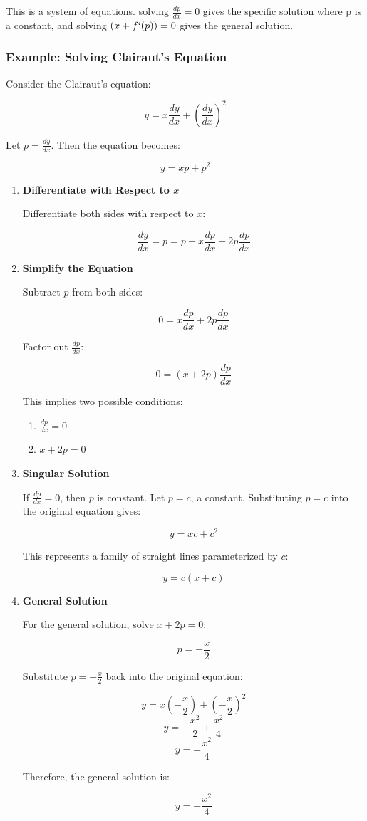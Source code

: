 \documentclass[12pt]{article}
\begin{document}
This is a system of equations. solving \(\frac{dp}{dx}=0\) gives the specific solution where p is a constant, and solving \((x + f`(p))=0\) gives the general solution.

\subsubsection{Example: Solving Clairaut's Equation}
Consider the Clairaut's equation:

\[ y = x \frac{dy}{dx} + \left(\frac{dy}{dx}\right)^2 \]

Let \( p = \frac{dy}{dx} \). Then the equation becomes:

\[ y = x p + p^2 \]

\begin{enumerate}
\item \textbf{Differentiate with Respect to \( x \)}

Differentiate both sides with respect to \( x \):

\[ \frac{dy}{dx} = p = p + x \frac{dp}{dx} + 2p \frac{dp}{dx} \]

\item \textbf{Simplify the Equation}

Subtract \( p \) from both sides:

\[ 0 = x \frac{dp}{dx} + 2p \frac{dp}{dx} \]

Factor out \( \frac{dp}{dx} \):

\[ 0 = (x + 2p) \frac{dp}{dx} \]

This implies two possible conditions:
\begin{enumerate}
\item \( \frac{dp}{dx} = 0 \)
\item \( x + 2p = 0 \)
\end{enumerate}

\item \textbf{Singular Solution}

If \( \frac{dp}{dx} = 0 \), then \( p \) is constant. Let \( p = c \), a constant. Substituting \( p = c \) into the original equation gives:

\[ y = x c + c^2 \]

This represents a family of straight lines parameterized by \( c \):

\[ y = c(x + c) \]

\item \textbf{General Solution}

For the general solution, solve \( x + 2p = 0 \):

\[ p = -\frac{x}{2} \]

Substitute \( p = -\frac{x}{2} \) back into the original equation:

\[ y = x \left(-\frac{x}{2}\right) + \left(-\frac{x}{2}\right)^2 \]
\[ y = -\frac{x^2}{2} + \frac{x^2}{4} \]
\[ y = -\frac{x^2}{4} \]

Therefore, the general solution is:

\[ y = -\frac{x^2}{4} \]

\end{enumerate}
\end{document}

